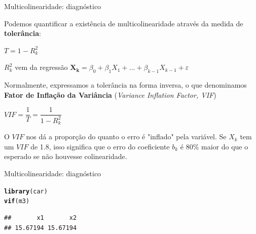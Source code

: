 \documentclass{beamer}\usepackage[]{graphicx}\usepackage[]{color}
\makeatletter
\newcommand{\hlstd}[1]{\textcolor[rgb]{0.345,0.345,0.345}{#1}}%
\newcommand{\hlkwd}[1]{\textcolor[rgb]{0.737,0.353,0.396}{\textbf{#1}}}%
\newenvironment{kframe}{%
 \def\at@end@of@kframe{}%
 \ifinner\ifhmode%
  \def\at@end@of@kframe{\end{minipage}}%
  \begin{minipage}{\columnwidth}%
 \fi\fi%
 \def\FrameCommand##1{\hskip\@totalleftmargin \hskip-\fboxsep
 \colorbox{shadecolor}{##1}\hskip-\fboxsep
     \hskip-\linewidth \hskip-\@totalleftmargin \hskip\columnwidth}%
 \MakeFramed {\advance\hsize-\width
   \@totalleftmargin\z@ \linewidth\hsize
   \@setminipage}}%
 {\par\unskip\endMakeFramed%
 \at@end@of@kframe}
\newenvironment{knitrout}{}{} %
\renewenvironment{knitrout}{\setlength{\topsep}{0mm}}{}
\makeatother
\begin{document}
\begin{frame}{Multicolinearidade: diagnóstico}

\begin{small}

Podemos quantificar a existência de multicolinearidade através da medida de \textbf{tolerância}:

\vfill

$T = 1 - R^2_k$ \pause

\vfill

$R^2_k$ vem da regressão $\mathbf{X_k} = \beta _0 + \beta _1 X_1 + \ldots + \beta _{k-1} X_{k-1} + \varepsilon$ \pause

\vfill
Normalmente, expressamos a tolerância na forma inversa, o que denominamos \textbf{Fator de Inflação da Variância} (\emph{Variance Inflation Factor, VIF})

\vfill

$VIF = \dfrac{1}{T} = \dfrac{1}{1-R^2 _k}$ \pause
\vfill

O $VIF$ nos dá a proporção do quanto o erro é "inflado" pela variável. Se $X_k$ tem um $VIF$ de 1.8, isso significa que o erro do coeficiente $b _k$ é 80\% maior do que o esperado se não houvesse colinearidade.

\end{small}

\end{frame}


\begin{frame}[fragile]{Multicolinearidade: diagnóstico}

\begin{knitrout}\tiny
{}\color{fgcolor}\begin{kframe}
\begin{alltt}
\hlkwd{library}\hlstd{(car)}
\hlkwd{vif}\hlstd{(m3)}
\end{alltt}
\begin{verbatim}
##       x1       x2 
## 15.67194 15.67194
\end{verbatim}
\end{kframe}
\end{knitrout}


\end{frame}
\end{document}
